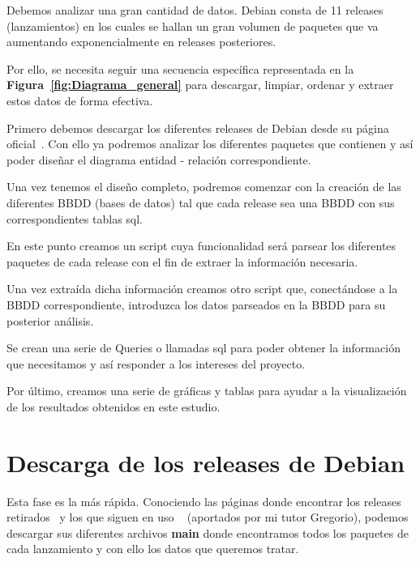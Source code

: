 \documentclass[a4paper, 12pt]{book}
\begin{document}
Debemos analizar una gran cantidad de datos. Debian consta de 11 releases (lanzamientos) en los cuales se hallan un gran volumen de paquetes que va aumentando exponencialmente en releases posteriores.

Por ello, se necesita seguir una secuencia específica representada en la \textbf {Figura~\ref{fig:Diagrama_general}} para descargar, limpiar, ordenar y extraer estos datos de forma efectiva. 

Primero debemos descargar los diferentes releases de Debian desde su página oficial~\cite{debian:_releases}.
Con ello ya podremos analizar los diferentes paquetes que contienen y así poder diseñar el diagrama entidad - relación correspondiente.

Una vez tenemos el diseño completo, podremos comenzar con la creación de las diferentes BBDD (bases de datos) tal que cada release sea una BBDD con sus correspondientes tablas sql.

En este punto creamos un script cuya funcionalidad será parsear los diferentes paquetes de cada release con el fin de extraer la información necesaria.

Una vez extraída dicha información creamos otro script que, conectándose a la BBDD correspondiente, introduzca los datos parseados en la BBDD para su posterior análisis.

Se crean una serie de Queries o llamadas sql para poder obtener la información que necesitamos y así responder a los intereses del proyecto.

Por último, creamos una serie de gráficas y tablas para ayudar a la visualización de los resultados obtenidos en este estudio.


\section{Descarga de los releases de Debian} 
\label{sec:Descarga_de_los_releases_de_Debian}

Esta fase es la más rápida. Conociendo las páginas donde encontrar los releases retirados~\cite{debian:_releases_archive} y los que siguen en uso ~\cite{debian:_releases} (aportados por mi tutor Gregorio), podemos descargar sus diferentes archivos \textbf{main} donde encontramos todos los paquetes de cada lanzamiento y con ello los datos que queremos tratar.
\end{document}
